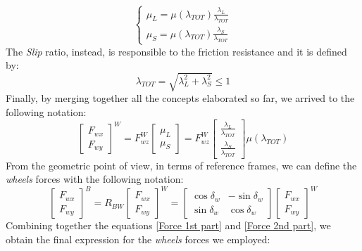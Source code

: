 \begin{equation}
\begin{cases}
\mu_{L} = \mu(\lambda_{TOT}) \frac{\lambda_{L}}{\lambda_{TOT}}\\
\mu_{S} = \mu(\lambda_{TOT}) \frac{\lambda_{S}}{\lambda_{TOT}}
\end{cases}
\end{equation}
The \textit{Slip} ratio, instead, is responsible to the friction resistance and it is defined by:
\begin{equation}
\lambda_{TOT} = \sqrt{\lambda_{L}^{2} + \lambda_{S}^{2}} \leq 1
\end{equation}
Finally, by merging together all the concepts elaborated so far, we arrived to the following notation:	
\begin{equation} \label{Force 1st part}
\begin{bmatrix}
F_{wx} \\
F_{wy}
\end{bmatrix}^{W} = 
F_{wz}^{W}
\begin{bmatrix}
\mu_{L} \\
\mu_{S}
\end{bmatrix} = 
F_{wz}^{W}
\begin{bmatrix}
\frac{\lambda_{L}}{\lambda_{TOT}} \\
\frac{\lambda_{S}}{\lambda_{TOT}}
\end{bmatrix}
\mu(\lambda_{TOT})	
\end{equation}
From the geometric point of view, in terms of reference frames, we can define the \textit{wheels} forces with the following notation:
\begin{equation} \label{Force 2nd part}
\begin{bmatrix}
F_{wx} \\
F_{wy}
\end{bmatrix}^{B} =	
R_{BW}
\begin{bmatrix}
F_{wx} \\
F_{wy}
\end{bmatrix}^{W} =
\begin{bmatrix}
\cos\delta_{w} & -\sin\delta_{w} \\
\sin\delta_{w} & \cos\delta_{w}
\end{bmatrix}
\begin{bmatrix}
F_{wx} \\
F_{wy}
\end{bmatrix}^{W}
\end{equation}
Combining together the equations \ref{Force 1st part} and \ref{Force 2nd part}, we obtain the final expression for the \textit{wheels} forces we employed:
